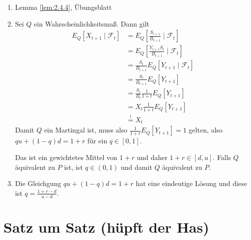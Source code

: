 \documentclass[a4paper,twoside,DIV15,BCOR12mm]{scrbook}
\newcommand{\cF}{\mathcal F}
\begin{document}
\begin{beweis}
\begin{enumerate}
\item Lemma \ref{lem:2.4.4}, Übungsblatt
\item Sei $Q$ ein Wahrscheinlichkeitsmaß. Dann gilt
\begin{align*}
E_Q[X_{t+1}\mid \cF_t]
&= E_Q[\frac{S_{t+1}}{B_{t+1}} \mid\cF_t] \\
&= E_Q[\frac{Y_{t+1}S_t}{B_{t+1}} \mid \cF_t] \\
&= \frac{S_t}{B_{t+1}} E_Q[Y_{t+1} \mid \cF_t] \\
&= \frac{S_t}{B_{t+1}} E_Q[Y_{t+1}] \\
&= \frac{S_t}{B_t} \frac{1}{1+t} E_Q[Y_{t+1}] \\
&= X_t \frac{1}{1+t} E_Q[Y_{t+1}] \\
&\stackrel ! = X_t 
\end{align*}
Damit $Q$ ein Martingal ist, muss also $\frac{1}{1+r} E_Q[Y_{t+1}] = 1$ gelten, also $qu + (1-q)d = 1+r$ für ein $q\in[0, 1]$.

Das ist ein gewichtetes Mittel von $1+r$ und daher $1+r\in [d,u]$. Falls $Q$ äquivalent zu $P$ ist, ist $q\in(0, 1)$ und damit $Q$ äquivalent zu $P$.
\item Die Gleichgung $qu + (1-q)d = 1+r$  hat eine eindeutige Lösung und diese ist $q=\frac{1+r-d}{u-d}$.
\end{enumerate}
\end{beweis}




\setcounter{secnumdepth}{-1}
\chapter{Satz um Satz (hüpft der Has)}

\renewcommand{\indexname}{Stichwortverzeichnis}
\printindex
\end{document}
